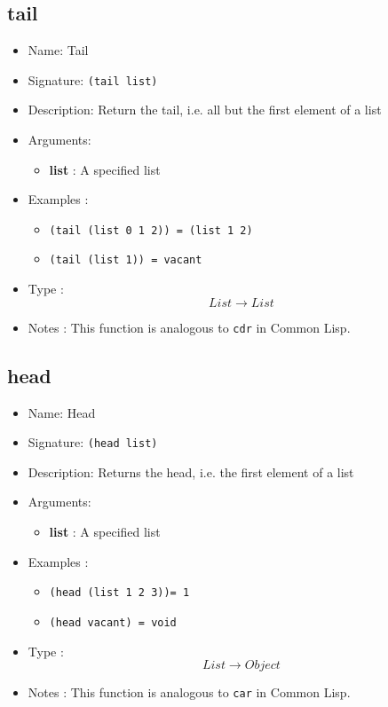 \subsection{tail}
\begin{itemize}
    \item Name: Tail
    \item Signature: \texttt{(tail list)}
    \item Description: Return the tail, i.e. all but the first element of a list
    \item Arguments:
        \begin{itemize}
            \item \textbf{list} : A specified list
        \end{itemize}
    \item Examples :
        \begin{itemize}
            \item \texttt{(tail (list 0 1 2)) = (list 1 2)}
            \item \texttt{(tail (list 1)) = vacant}
        \end{itemize}
    \item Type : \[List \to List\]
    \item Notes : This function is analogous to \texttt{cdr} in Common Lisp.
\end{itemize}

\subsection{head}
\begin{itemize}
    \item Name: Head
    \item Signature: \texttt{(head list)}
    \item Description: Returns the head, i.e. the first element of a list
    \item Arguments:
        \begin{itemize}
            \item \textbf{list} : A specified list
        \end{itemize}
    \item Examples :
        \begin{itemize}
            \item \texttt{(head (list 1 2 3))= 1}
            \item \texttt{(head vacant) = void}
        \end{itemize}
    \item Type : \[List \to Object\]
    \item Notes : This function is analogous to \texttt{car} in Common Lisp.
\end{itemize}

